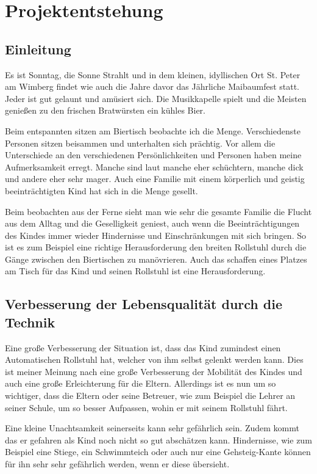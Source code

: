 \section{Projektentstehung}
\subsection{Einleitung}
Es ist Sonntag, die Sonne Strahlt und in dem kleinen, idyllischen Ort St. Peter am Wimberg findet wie auch die Jahre davor das Jährliche Maibaumfest statt.
Jeder ist gut gelaunt und amüsiert sich.
Die Musikkapelle spielt und die Meisten genießen zu den frischen Bratwürsten ein kühles Bier.

Beim entspannten sitzen am Biertisch beobachte ich die Menge.
Verschiedenste Personen sitzen beisammen und unterhalten sich prächtig.
Vor allem die Unterschiede an den verschiedenen Persönlichkeiten und Personen haben meine Aufmerksamkeit erregt.
Manche sind laut manche eher schüchtern, manche dick und andere eher sehr mager.
Auch eine Familie mit einem körperlich und geistig beeinträchtigten Kind hat sich in die Menge gesellt.

Beim beobachten aus der Ferne sieht man wie sehr die gesamte Familie die Flucht aus dem Alltag und die Geselligkeit geniest, auch wenn die Beeinträchtigungen des Kindes immer wieder Hindernisse und Einschränkungen mit sich bringen.
So ist es zum Beispiel eine richtige Herausforderung den breiten Rollstuhl durch die Gänge zwischen den Biertischen zu manövrieren. 
Auch das schaffen eines Platzes am Tisch für das Kind und seinen Rollstuhl ist eine Herausforderung.


\subsection{Verbesserung der Lebensqualität durch die Technik}
Eine große Verbesserung der Situation ist, dass das Kind zumindest einen Automatischen Rollstuhl hat, welcher von ihm selbst gelenkt werden kann.
Dies ist meiner Meinung nach eine große Verbesserung der Mobilität des Kindes und auch eine große Erleichterung für die Eltern.
Allerdings ist es nun um so wichtiger, dass die Eltern oder seine Betreuer, wie zum Beispiel die Lehrer an seiner Schule, um so besser Aufpassen, wohin er mit seinem Rollstuhl fährt.

Eine kleine Unachtsamkeit seinerseits kann sehr gefährlich sein.
Zudem kommt das er gefahren als Kind noch nicht so gut abschätzen kann.
Hindernisse, wie zum Beispiel eine Stiege, ein Schwimmteich oder auch nur eine Gehsteig-Kante können für ihn sehr sehr gefährlich werden, wenn er diese übersieht.


